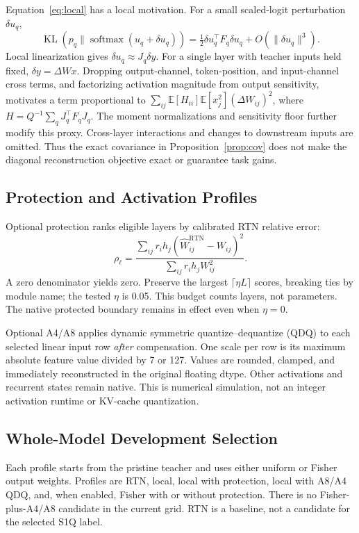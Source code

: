 \documentclass[10pt,twocolumn]{article}
\newcommand{\E}{\mathbb E}
\newcommand{\softmax}{\operatorname{softmax}}
\newcommand{\KL}{\operatorname{KL}}
\begin{document}
Equation~\eqref{eq:local} has a local motivation. For a small scaled-logit
perturbation $\delta u_q$,
\begin{equation}
 \KL(p_q\|\softmax(u_q+\delta u_q))
 =\tfrac12\delta u_q^\top F_q\delta u_q
 +O(\|\delta u_q\|^3).
\end{equation}
Local linearization gives $\delta u_q\approx J_q\delta y$.
For a single layer with teacher inputs held fixed,
$\delta y=\Delta W x$. Dropping output-channel, token-position, and
input-channel cross terms, and factorizing activation magnitude from
output sensitivity, motivates a term proportional to
$\sum_{ij}\E[H_{ii}]\E[x_j^2](\Delta W_{ij})^2$, where
$H=Q^{-1}\sum_qJ_q^\top F_qJ_q$.
The moment normalizations and sensitivity floor further modify this proxy.
Cross-layer interactions and changes to downstream inputs are omitted.
Thus the exact covariance in Proposition~\ref{prop:cov} does not make
the diagonal reconstruction objective exact or guarantee task gains.

\subsection{Protection and Activation Profiles}
Optional protection ranks eligible layers by calibrated RTN relative error:
\begin{equation}
 \rho_\ell=
 \frac{\sum_{ij}r_i h_j
    (\widehat W^{\mathrm{RTN}}_{ij}-W_{ij})^2}
      {\sum_{ij}r_i h_jW_{ij}^2}.
\end{equation}
A zero denominator yields zero. Preserve the largest
$\lceil\eta L\rceil$ scores, breaking ties by module name;
the tested $\eta$ is 0.05. This budget counts layers, not parameters.
The native protected boundary remains in effect even when $\eta=0$.

Optional A4/A8 applies dynamic symmetric quantize--dequantize (QDQ) to
each selected linear input row \emph{after} compensation.
One scale per row is its maximum absolute feature value divided by
7 or 127. Values are rounded, clamped, and immediately reconstructed
in the original floating dtype. Other activations and recurrent states
remain native. This is numerical simulation, not an integer activation
runtime or KV-cache quantization.

\subsection{Whole-Model Development Selection}
Each profile starts from the pristine teacher and uses either uniform
or Fisher output weights. Profiles are RTN, local, local with protection,
local with A8/A4 QDQ, and, when enabled, Fisher with or without protection.
There is no Fisher-plus-A4/A8 candidate in the current grid.
RTN is a baseline, not a candidate for the selected S1Q label.
\end{document}

